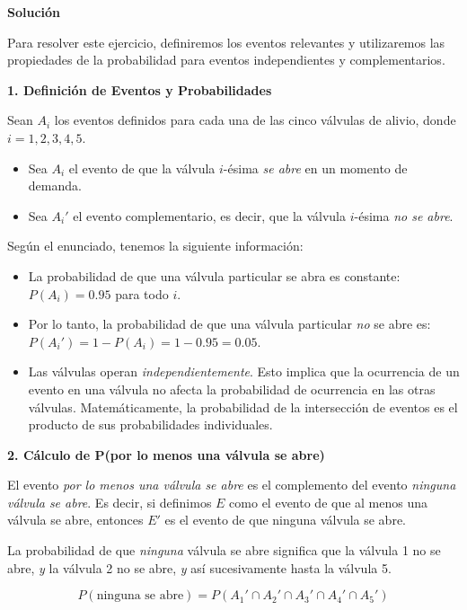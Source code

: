 \documentclass[a4paper]{article}
\begin{document}
\vspace{0.5cm}

\textbf{Solución}

Para resolver este ejercicio, definiremos los eventos relevantes y utilizaremos las propiedades de la probabilidad para eventos independientes y complementarios.

\textbf{1. Definición de Eventos y Probabilidades}

Sean $A_i$ los eventos definidos para cada una de las cinco válvulas de alivio, donde $i = 1, 2, 3, 4, 5$.

\begin{itemize}
    \item Sea $A_i$ el evento de que la válvula $i$-ésima \textit{se abre} en un momento de demanda.
    \item Sea $A_i'$ el evento complementario, es decir, que la válvula $i$-ésima \textit{no se abre}.
\end{itemize}

Según el enunciado, tenemos la siguiente información:
\begin{itemize}
    \item La probabilidad de que una válvula particular se abra es constante: $P(A_i) = 0.95$ para todo $i$.
    \item Por lo tanto, la probabilidad de que una válvula particular \textit{no} se abre es: $P(A_i') = 1 - P(A_i) = 1 - 0.95 = 0.05$.
    \item Las válvulas operan \textit{independientemente}. Esto implica que la ocurrencia de un evento en una válvula no afecta la probabilidad de ocurrencia en las otras válvulas. Matemáticamente, la probabilidad de la intersección de eventos es el producto de sus probabilidades individuales.
\end{itemize}

\textbf{2. Cálculo de P(por lo menos una válvula se abre)}

El evento \textit{por lo menos una válvula se abre} es el complemento del evento \textit{ninguna válvula se abre}. Es decir, si definimos $E$ como el evento de que al menos una válvula se abre, entonces $E'$ es el evento de que ninguna válvula se abre.

La probabilidad de que \textit{ninguna} válvula se abre significa que la válvula 1 no se abre, \textit{y} la válvula 2 no se abre, \textit{y} así sucesivamente hasta la válvula 5.

$$ P(\text{ninguna se abre}) = P(A_1' \cap A_2' \cap A_3' \cap A_4' \cap A_5') $$
\end{document}
